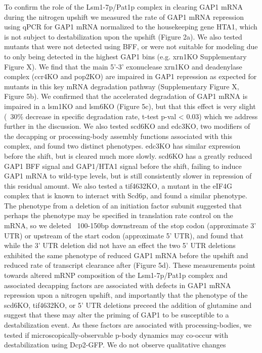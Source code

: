 To confirm the role of the Lsm1-7p/Pat1p  complex in clearing GAP1
mRNA during the nitrogen upshift we measured the rate of GAP1 mRNA
repression using qPCR for GAP1 mRNA normalized to the housekeeping
gene HTA1, which is not subject to destabilization upon the upshift
(Figure 2a). We also tested mutants that were not detected using BFF,
or were not suitable for modeling due to only being detected in the
highest GAP1 bins (e.g. xrn1KO Supplementary Figure X). We find that
the main 5’-3’ exonuclease xrn1KO and deadenylase complex (ccr4KO and
pop2KO) are impaired in GAP1 repression as expected for mutants in
this key mRNA degradation pathway (Supplementary Figure X, Figure
5b). We confirmed that the accelerated degradation of GAP1 mRNA is
impaired in a lsm1KO and lsm6KO (Figure 5c), but that this effect is
very slight (~30\% decrease in specific degradation rate, t-test p-val
< 0.03) which we address further in the discussion. We also tested
scd6KO and edc3KO, two modifiers of the decapping or processing-body
assembly functions associated with this complex, and found two
distinct phenotypes.  edc3KO has similar expression before the shift,
but is cleared much more slowly. scd6KO has a greatly reduced GAP1 BFF
signal and GAP1/HTA1 signal before the shift, failing to induce GAP1
mRNA to wild-type levels, but is still consistently slower in
repression of this residual amount. We also tested a tif4632KO, a
mutant in the eIF4G complex that is known to interact with Scd6p, and
found a similar phenotype. The phenotype from a deletion of an
initiation factor subunit suggested that perhaps the phenotype may be
specified in translation rate control on the mRNA, so we deleted
~100-150bp downstream of the stop codon (approximate 3’ UTR) or
upstream of the start codon (approximate 5’ UTR), and found that while
the 3’ UTR deletion did not have an effect the two 5’ UTR deletions
exhibited the same phenotype of reduced GAP1 mRNA before the upshift
and reduced rate of transcript clearance after (Figure 5d). These
measurements point towards altered mRNP composition of the
Lsm1-7p/Pat1p complex and associated decapping factors are associated
with defects in GAP1 mRNA repression upon a nitrogen upshift, and
importantly that the phenotype of the scd6KO, tif4632KO, or 5’ UTR
deletions preceed the addition of glutamine and suggest that these may
alter the priming of GAP1 to be susceptible to a destabilization
event.  As these factors are associated with processing-bodies, we
tested if microscopically-observable p-body dynamics may co-occur with
destabilization using Dcp2-GFP. We do not observe qualitative changes
